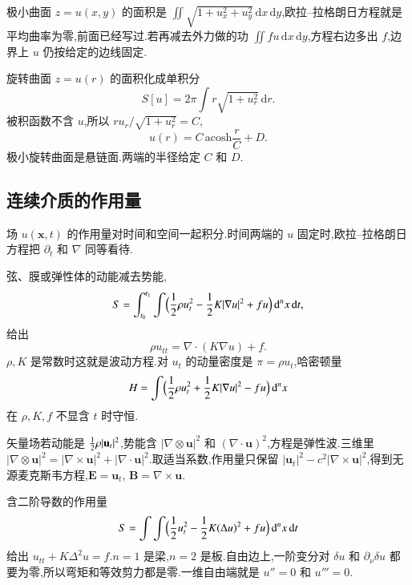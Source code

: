 极小曲面 $z=u(x,y)$ 的面积是 $\iint\sqrt{1+u_x^2+u_y^2}\,\mathrm{d}x\,\mathrm{d}y$,欧拉--拉格朗日方程就是平均曲率为零,前面已经写过.若再减去外力做的功 $\iint f u\,\mathrm{d}x\,\mathrm{d}y$,方程右边多出 $f$,边界上 $u$ 仍按给定的边线固定.

旋转曲面 $z=u(r)$ 的面积化成单积分
\begin{equation}
  S[u]=2\pi\int r\sqrt{1+u_r^2}\,\mathrm{d}r.
\end{equation}
被积函数不含 $u$,所以 $r u_r/\sqrt{1+u_r^2}=C$,
\begin{equation}
  u(r)=C\,\mathrm{acosh}\frac{r}{C}+D.
\end{equation}
极小旋转曲面是悬链面.两端的半径给定 $C$ 和 $D$.

\subsection{连续介质的作用量}
场 $u(\mathbf{x},t)$ 的作用量对时间和空间一起积分.时间两端的 $u$ 固定时,欧拉--拉格朗日方程把 $\partial_t$ 和 $\nabla$ 同等看待.

弦、膜或弹性体的动能减去势能,
\begin{equation}
  S=\int_{t_0}^{t_1}\int\Bigl({\frac{1}{2}}\rho u_t^2-{\frac{1}{2}} K|\nabla u|^2+fu\Bigr)\,\mathrm{d}^n x\,\mathrm{d}t,
\end{equation}
给出
\begin{equation}
  \rho u_{tt}=\nabla\cdot(K\nabla u)+f.
\end{equation}
$\rho,K$ 是常数时这就是波动方程.对 $u_t$ 的动量密度是 $\pi=\rho u_t$,哈密顿量
\begin{equation}
  H=\int\Bigl({\frac{1}{2}}\rho u_t^2+{\frac{1}{2}} K|\nabla u|^2-fu\Bigr)\,\mathrm{d}^n x
\end{equation}
在 $\rho,K,f$ 不显含 $t$ 时守恒.

矢量场若动能是 ${\frac{1}{2}}\rho|\mathbf{u}_t|^2$,势能含 $|\nabla\otimes\mathbf{u}|^2$ 和 $(\nabla\cdot\mathbf{u})^2$,方程是弹性波.三维里 $|\nabla\otimes\mathbf{u}|^2=|\nabla\times\mathbf{u}|^2+|\nabla\cdot\mathbf{u}|^2$.取适当系数,作用量只保留 $|\mathbf{u}_t|^2-c^2|\nabla\times\mathbf{u}|^2$,得到无源麦克斯韦方程,$\mathbf{E}=\mathbf{u}_t$, $\mathbf{B}=\nabla\times\mathbf{u}$.

含二阶导数的作用量
\begin{equation}
  S=\int\int\Bigl({\frac{1}{2}} u_t^2-{\frac{1}{2}} K(\Delta u)^2+fu\Bigr)\,\mathrm{d}^n x\,\mathrm{d}t
\end{equation}
给出 $u_{tt}+K\Delta^2 u=f$.$n=1$ 是梁,$n=2$ 是板.自由边上,一阶变分对 $\delta u$ 和 $\partial_\nu\delta u$ 都要为零,所以弯矩和等效剪力都是零.一维自由端就是 $u''=0$ 和 $u'''=0$.

